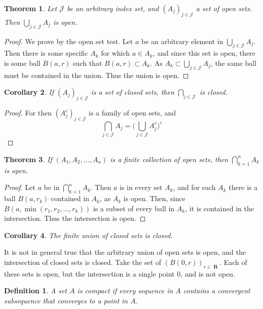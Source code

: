 \documentclass{report}
\newtheorem{theorem}{Theorem}[chapter]
\newtheorem{corollary}[theorem]{Corollary}
\newtheorem{definition}{Definition}
\DeclareMathOperator{\real}{\mathbf{R}}
\begin{document}
\begin{theorem}
  Let $\mathcal{J}$ be an arbitrary index set, and $(A_j)_{j \in \mathcal{J}}$ a set of open sets. Then $\bigcup_{j \in \mathcal{J}} A_j$ is open.
\end{theorem}
\begin{proof}
  We prove by the open set test. Let $a$ be an arbitrary element in $\bigcup_{j \in \mathcal{J}} A_j$. Then there is some specific $A_k$ for which $a \in A_k$, and since this set is open, there is some ball $B(a,r)$ such that $B(a,r) \subset A_k$. As $A_k \subset \bigcup_{j \in \mathcal{J}} A_j$, the same ball must be contained in the union. Thus the union is open.
\end{proof}

\begin{corollary}
  If $(A_j)_{j \in \mathcal{J}}$ is a set of closed sets, then $\bigcap_{j \in \mathcal{J}}$ is closed.
\end{corollary}
\begin{proof}
  For then $(A_j^c)_{j \in \mathcal{J}}$ is a family of open sets, and
  \[ \bigcap_{j \in \mathcal{J}} A_j = \bigg( \bigcup_{j \in \mathcal{J}} A_j^c \bigg)^c \]
\end{proof}

\begin{theorem}
  If $(A_1, A_2, \dots, A_n)$ is a finite collection of open sets, then $\bigcap_{k = 1}^n A_k$ is open.
\end{theorem}
\begin{proof}
  Let $a$ be in $\bigcap_{k = 1}^n A_k$. Then $a$ is in every set $A_k$, and for each $A_k$ there is a ball $B(a,r_k)$ contained in $A_k$, as $A_k$ is open. Then, since $B(a,\min(r_1,r_2, \dots, r_k))$ is a subset of every ball in $A_k$, it is contained in the intersection. Thus the intersection is open.
\end{proof}

\begin{corollary}
  The finite union of closed sets is closed.
\end{corollary}

It is not in general true that the arbitrary union of open sets is open, and the intersection of closed sets is closed. Take the set of $(B(0,r))_{r \in \real}$. Each of these sets is open, but the intersection is a single point 0, and is not open.

\begin{definition}
  A set $A$ is compact if every sequence in $A$ contains a convergent subsequence that converges to a point in $A$.
\end{definition}
\end{document}
